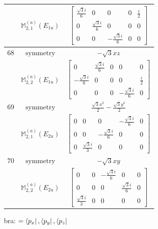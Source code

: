\documentclass[fleqn,8pt,landscape]{jsarticle}
\begin{document}
\begin{longtable}{ccc}
$  $ & $ \mathbb{M}_{2,1}^{(a)}(E_{1u}) $ & $ \begin{bmatrix} \frac{\sqrt{3} i}{6} & 0 & 0 & 0 & \frac{i}{2} \\ 0 & \frac{\sqrt{3} i}{6} & 0 & 0 & 0 \\ 0 & 0 & - \frac{\sqrt{3} i}{6} & 0 & 0 \end{bmatrix} $ \\ \hline
$ 68 $ & $ \text{symmetry} $ & $ - \sqrt{3} x z $ \\
$  $ & $ \mathbb{M}_{2,2}^{(a)}(E_{1u}) $ & $ \begin{bmatrix} 0 & \frac{\sqrt{3} i}{6} & 0 & 0 & 0 \\ - \frac{\sqrt{3} i}{6} & 0 & 0 & 0 & \frac{i}{2} \\ 0 & 0 & 0 & - \frac{\sqrt{3} i}{6} & 0 \end{bmatrix} $ \\ \hline
$ 69 $ & $ \text{symmetry} $ & $ \frac{\sqrt{3} x^{2}}{2} - \frac{\sqrt{3} y^{2}}{2} $ \\
$  $ & $ \mathbb{M}_{2,1}^{(a)}(E_{2u}) $ & $ \begin{bmatrix} 0 & 0 & 0 & - \frac{\sqrt{3} i}{6} & 0 \\ 0 & 0 & - \frac{\sqrt{3} i}{6} & 0 & 0 \\ 0 & \frac{\sqrt{3} i}{3} & 0 & 0 & 0 \end{bmatrix} $ \\ \hline
$ 70 $ & $ \text{symmetry} $ & $ - \sqrt{3} x y $ \\
$  $ & $ \mathbb{M}_{2,2}^{(a)}(E_{2u}) $ & $ \begin{bmatrix} 0 & 0 & - \frac{\sqrt{3} i}{6} & 0 & 0 \\ 0 & 0 & 0 & \frac{\sqrt{3} i}{6} & 0 \\ \frac{\sqrt{3} i}{3} & 0 & 0 & 0 & 0 \end{bmatrix} $ \\ \hline
\end{longtable}
bra: $=\bra{p_{x}}, \bra{p_{y}}, \bra{p_{z}}$
\end{document}
